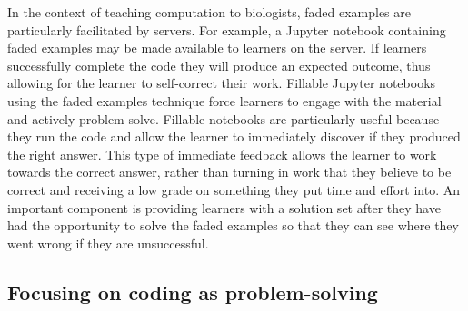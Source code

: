 In the context of teaching computation to biologists, faded examples are particularly facilitated by servers.
For example, a Jupyter notebook containing faded examples may be made available to learners on the server.
If learners successfully complete the code they will produce an expected outcome, thus allowing for the learner to self-correct their work.
Fillable Jupyter notebooks using the faded examples technique force learners to engage with the material and actively problem-solve. 
Fillable notebooks are particularly useful because they run the code and allow the learner to immediately discover if they produced the right answer. 
This type of immediate feedback allows the learner to work towards the correct answer, rather than turning in work that they believe to be correct and receiving a low grade on something they put time and effort into.
An important component is providing learners with a solution set after they have had the opportunity to solve the faded examples so that they can see where they went wrong if they are unsuccessful.

\subsection{Focusing on coding as problem-solving}

